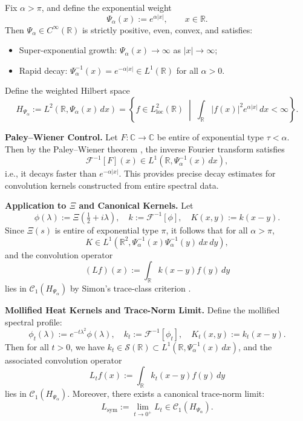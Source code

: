 \begin{definition}\label{def:exponential_weight}
Fix \( \alpha > \pi \), and define the exponential weight
\[
\Psi_\alpha(x) := e^{\alpha |x|}, \qquad x \in \mathbb{R}.
\]
Then \( \Psi_\alpha \in C^\infty(\mathbb{R}) \) is strictly positive, even, convex, and satisfies:
\begin{itemize}
    \item Super-exponential growth: \( \Psi_\alpha(x) \to \infty \) as \( |x| \to \infty \);
    \item Rapid decay: \( \Psi_\alpha^{-1}(x) = e^{-\alpha |x|} \in L^1(\mathbb{R}) \) for all \( \alpha > 0 \).
\end{itemize}

Define the weighted Hilbert space
\[
H_{\Psi_\alpha} := L^2(\mathbb{R}, \Psi_\alpha(x)\, dx) = \left\{ f \in L^2_{\mathrm{loc}}(\mathbb{R}) \;\middle|\; \int_{\mathbb{R}} |f(x)|^2 e^{\alpha |x|}\, dx < \infty \right\}.
\]

\medskip
\noindent\textbf{Paley--Wiener Control.}
Let \( F \colon \mathbb{C} \to \mathbb{C} \) be entire of exponential type \( \tau < \alpha \). Then by the Paley--Wiener theorem \cite[Thm.~3.2.4]{Levin1996EntireLectures}, the inverse Fourier transform satisfies
\[
\mathcal{F}^{-1}[F](x) \in L^1(\mathbb{R}, \Psi_\alpha^{-1}(x)\, dx),
\]
i.e., it decays faster than \( e^{-\alpha |x|} \). This provides precise decay estimates for convolution kernels constructed from entire spectral data.

\medskip
\noindent\textbf{Application to \(\Xi\) and Canonical Kernels.}
Let
\[
\phi(\lambda) := \Xi\left( \tfrac{1}{2} + i\lambda \right), \quad
k := \mathcal{F}^{-1}[\phi], \quad
K(x,y) := k(x - y).
\]
Since \( \Xi(s) \) is entire of exponential type \( \pi \), it follows that for all \( \alpha > \pi \),
\[
K \in L^1(\mathbb{R}^2, \Psi_\alpha^{-1}(x)\Psi_\alpha^{-1}(y)\, dx\,dy),
\]
and the convolution operator
\[
(Lf)(x) := \int_{\mathbb{R}} k(x - y) f(y)\, dy
\]
lies in \( \mathcal{C}_1(H_{\Psi_\alpha}) \) by Simon's trace-class criterion \cite[Thm.~4.2]{Simon2005TraceIdeals}.

\medskip
\noindent\textbf{Mollified Heat Kernels and Trace-Norm Limit.}
Define the mollified spectral profile:
\[
\phi_t(\lambda) := e^{-t\lambda^2} \phi(\lambda), \quad
k_t := \mathcal{F}^{-1}[\phi_t], \quad
K_t(x,y) := k_t(x - y).
\]
Then for all \( t > 0 \), we have \( k_t \in \mathcal{S}(\mathbb{R}) \subset L^1(\mathbb{R}, \Psi_\alpha^{-1}(x)\, dx) \), and the associated convolution operator
\[
L_t f(x) := \int_{\mathbb{R}} k_t(x - y) f(y)\, dy
\]
lies in \( \mathcal{C}_1(H_{\Psi_\alpha}) \). Moreover, there exists a canonical trace-norm limit:
\[
L_{\mathrm{sym}} := \lim_{t \to 0^+} L_t \in \mathcal{C}_1(H_{\Psi_\alpha}).
\]


\end{definition}
